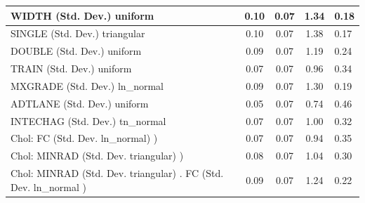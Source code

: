 \begin{table}
\begin{center}
\begin{tabular}{|l|l|c|c|c|l|}
			\hline
			WIDTH (Std. Dev.) uniform &  & 0.10 & 0.07 & 1.34 & 0.18 \\
			\hline
			SINGLE (Std. Dev.) triangular &  & 0.10 & 0.07 & 1.38 & 0.17 \\
			\hline
			DOUBLE (Std. Dev.) uniform &  & 0.09 & 0.07 & 1.19 & 0.24 \\
			\hline
			TRAIN (Std. Dev.) uniform &  & 0.07 & 0.07 & 0.96 & 0.34 \\
			\hline
			MXGRADE (Std. Dev.) ln_normal &  & 0.09 & 0.07 & 1.30 & 0.19 \\
			\hline
			ADTLANE (Std. Dev.) uniform &  & 0.05 & 0.07 & 0.74 & 0.46 \\
			\hline
			INTECHAG (Std. Dev.) tn_normal &  & 0.07 & 0.07 & 1.00 & 0.32 \\
			\hline
			 Chol: FC (Std. Dev. ln_normal) ) &  & 0.07 & 0.07 & 0.94 & 0.35 \\
			\hline
			 Chol: MINRAD (Std. Dev. triangular) ) &  & 0.08 & 0.07 & 1.04 & 0.30 \\
			\hline
			 Chol: MINRAD (Std. Dev. triangular) . FC (Std. Dev.   ln_normal ) &  & 0.09 & 0.07 & 1.24 & 0.22 \\
			\hline
		\end{tabular}
	\end{center}
\end{table}